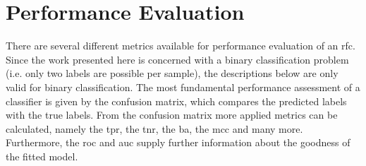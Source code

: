 \section{Performance Evaluation}\label{sec:perfeval}
There are several different metrics available for performance evaluation of an \ac{rfc}. Since the work presented here is concerned with a binary classification problem (i.e. only two labels are possible per sample), the descriptions below are only valid for binary classification. The most fundamental performance assessment of a classifier is given by the confusion matrix, which compares the predicted labels with the true labels. From the confusion matrix more applied metrics can be calculated, namely the \ac{tpr}, the \ac{tnr}, the \acl{ba}, the \ac{mcc} and many more. Furthermore, the \ac{roc} and \ac{auc} supply further information about the goodness of the fitted model.\cite{Fawcett2006}
%
